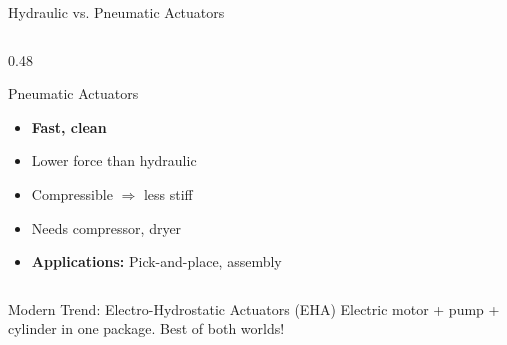 \documentclass[10pt]{beamer}
\begin{document}
\begin{frame}{Hydraulic vs. Pneumatic Actuators}
\begin{columns}
		\begin{column}{0.48\textwidth}
			\begin{block}{Pneumatic Actuators}
				\begin{center}
				\end{center}
				\begin{itemize}
					\item \textbf{Fast, clean}
					\item Lower force than hydraulic
					\item Compressible $\Rightarrow$ less stiff
					\item Needs compressor, dryer
					\item \textbf{Applications:} Pick-and-place, assembly
				\end{itemize}
			\end{block}
		\end{column}
	\end{columns}
	
	\vspace{5mm}
	\begin{alertblock}{Modern Trend: Electro-Hydrostatic Actuators (EHA)}
		Electric motor + pump + cylinder in one package. Best of both worlds!
	\end{alertblock}
\end{frame}
\end{document}
